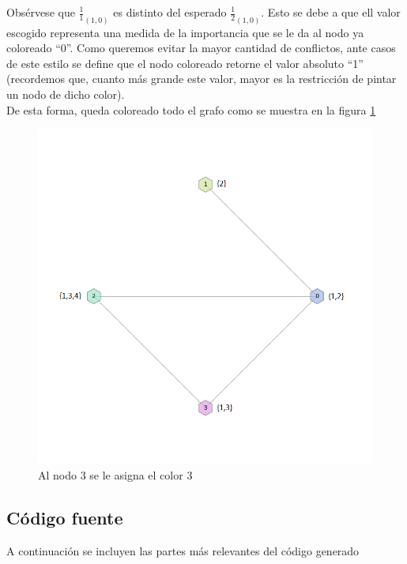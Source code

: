 Obsérvese que $\frac{1}{1}_{(1,0)}$ es distinto del esperado $\frac{1}{2}_{(1,0)}$. Esto se debe a que ell valor escogido representa una medida de la importancia que se le da al nodo ya coloreado ``0''. Como queremos evitar la mayor cantidad de conflictos, ante casos de este estilo se define que el nodo coloreado retorne el valor absoluto ``1'' (recordemos que, cuanto más grande este valor, mayor es la restricción de pintar un nodo de dicho color).\\

De esta forma, queda coloreado todo el grafo como se muestra en la figura \ref{4colores}

 \begin{figure}[H]
    \begin{center}
  	\includegraphics[width=13cm]{imagenes/Ej3/4Nodos4.png}
 	\caption{Al nodo 3 se le asigna el color 3}
 	\label{4colores}
    \end{center}
  \end{figure}


\subsection{Código fuente}

A continuación se incluyen las partes más relevantes del código generado\\

